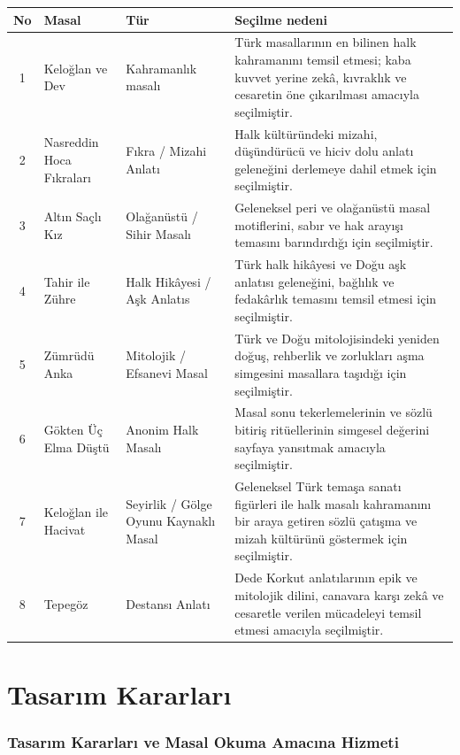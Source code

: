 \documentclass[12pt,a4paper]{article}
\begin{document}
\begin{longtable}{@{}cp{4cm}p{3cm}p{5.4cm}@{}}
\toprule
\textbf{No} & \textbf{Masal} & \textbf{Tür} & \textbf{Seçilme nedeni} \\
\midrule
\endhead
1 & Keloğlan ve Dev& Kahramanlık masalı& Türk masallarının en bilinen halk kahramanını temsil etmesi; kaba kuvvet yerine zekâ, kıvraklık ve cesaretin öne çıkarılması amacıyla seçilmiştir.\\
2 & Nasreddin Hoca Fıkraları& Fıkra / Mizahi Anlatı& Halk kültüründeki mizahi, düşündürücü ve hiciv dolu anlatı geleneğini derlemeye dahil etmek için seçilmiştir.\\
3 & Altın Saçlı Kız& Olağanüstü / Sihir Masalı& Geleneksel peri ve olağanüstü masal motiflerini, sabır ve hak arayışı temasını barındırdığı için seçilmiştir.\\
4 & Tahir ile Zühre& Halk Hikâyesi / Aşk Anlatıs& Türk halk hikâyesi ve Doğu aşk anlatısı geleneğini, bağlılık ve fedakârlık temasını temsil etmesi için seçilmiştir.\\
5 & Zümrüdü Anka& Mitolojik / Efsanevi Masal& Türk ve Doğu mitolojisindeki yeniden doğuş, rehberlik ve zorlukları aşma simgesini masallara taşıdığı için seçilmiştir.\\
6 & Gökten Üç Elma Düştü& Anonim Halk Masalı& Masal sonu tekerlemelerinin ve sözlü bitiriş ritüellerinin simgesel değerini sayfaya yansıtmak amacıyla seçilmiştir.\\
7 & Keloğlan ile Hacivat& Seyirlik / Gölge Oyunu Kaynaklı Masal& Geleneksel Türk temaşa sanatı figürleri ile halk masalı kahramanını bir araya getiren sözlü çatışma ve mizah kültürünü göstermek için seçilmiştir.\\
8 & Tepegöz& Destansı Anlatı& Dede Korkut anlatılarının epik ve mitolojik dilini, canavara karşı zekâ ve cesaretle verilen mücadeleyi temsil etmesi amacıyla seçilmiştir.\\
\bottomrule
\end{longtable}

\section{Tasarım Kararları}

\subsubsection{Tasarım Kararları ve Masal Okuma Amacına Hizmeti}
\end{document}
